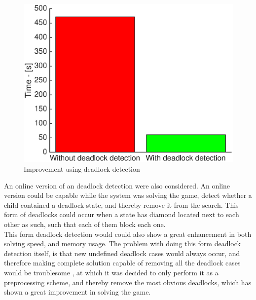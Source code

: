\begin{figure}[H]
\centering
\includegraphics[width = \textwidth]{images/deadlockImprovement}
\caption{Improvement using deadlock detection}
\end{figure} 
 
 
An online version of an deadlock detection were also considered.  An online version could be capable while the system was solving the game, detect whether a child contained a deadlock state, and thereby remove it from the search.  This form of deadlocks could occur when a state has diamond located next to each other as such, such that each of them block each one. \\

 
 


 
This form deadlock detection would could also show a great enhancement in both solving speed, and memory usage. 
The problem with doing this form deadlock detection itself, is that new undefined deadlock cases would always occur,  and therefore making complete solution capable of  removing all the deadlock cases would be troublesome , at which it was decided to only perform it as a preprocessing scheme, and thereby remove the most obvious deadlocks, which has shown a great improvement in solving the game. 




